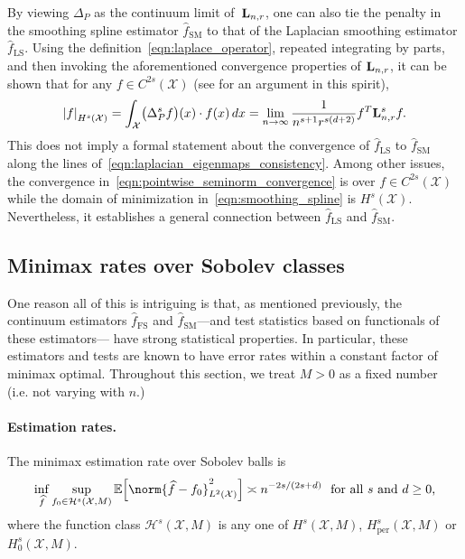\documentclass{article}
\newcommand{\abs}[1]{\left \lvert #1 \right \rvert}
\newcommand{\1}{\mathbf{1}}
\newcommand{\Lap}{{\bf L}}
\newcommand{\Xset}{\mathcal{X}}
\newcommand{\mc}[1]{\mathcal{#1}}
\newcommand{\Ebb}{\mathbb{E}}
\newcommand{\wh}[1]{\widehat{#1}}
\newcommand{\LS}{\mathrm{LS}}
\newcommand{\SM}{\mathrm{SM}}
\newcommand{\OS}{\mathrm{FS}}
\theoremstyle{alden}
\theoremstyle{aldenthm}
\theoremstyle{definition}
\theoremstyle{remark}
\begin{document}
By viewing $\Delta_P$ as the continuum limit of~$\Lap_{n,r}$, one can also tie the penalty in the smoothing spline estimator $\wh{f}_{\SM}$ to that of the Laplacian smoothing estimator $\wh{f}_{\LS}$. Using the definition~\eqref{eqn:laplace_operator}, repeated integrating by parts, and then invoking the aforementioned convergence properties of $\Lap_{n,r}$, it can be shown that for any $f \in C^{2s}(\Xset)$ (see \citet{zhou11} for an argument in this spirit),
\begin{equation}
\label{eqn:pointwise_seminorm_convergence}
\abs{f}_{H^s(\Xset)} = \int_{\Xset} \bigl(\Delta_P^sf\bigr)(x) \cdot f(x) \,dx = \lim_{n \to \infty} \frac{1}{n^{s + 1}r^{s(d + 2)}}f^T \Lap_{n,r}^s f.
\end{equation}
This does not imply a formal statement about the convergence of $\wh{f}_{\LS}$ to $\wh{f}_{\SM}$ along the lines of~\eqref{eqn:laplacian_eigenmaps_consistency}. Among other issues, the convergence in~\eqref{eqn:pointwise_seminorm_convergence} is over $f \in C^{2s}(\Xset)$ while the domain of minimization in~\eqref{eqn:smoothing_spline} is $H^{s}(\Xset)$. Nevertheless, it establishes a general connection between $\wh{f}_{\LS}$ and $\wh{f}_{\SM}$.

\subsection{Minimax rates over Sobolev classes}
\label{subsec:minimax_rates}
One reason all of this is intriguing is that, as mentioned previously, the continuum estimators $\wh{f}_{\OS}$ and $\wh{f}_{\SM}$---and test statistics based on functionals of these estimators--- have strong statistical properties. In particular, these estimators and tests are known to have error rates within a constant factor of minimax optimal. Throughout this section, we treat $M > 0$ as a fixed number (i.e. not varying with $n$.)

\paragraph{Estimation rates.}
The minimax estimation rate over Sobolev balls is 
\begin{equation}
\label{eqn:sobolev_space_estimation_minimax_rate}
\inf_{\wh{f}} \sup_{f_0 \in \mc{H}^s(\Xset, M)} \Ebb\Bigl[\norm{\wh{f} - f_0}_{L^2(\Xset)}^2\Bigr] \asymp n^{-2s/(2s + d)}~~\textrm{for all $s$ and $d \geq 0$,}
\end{equation}
where the function class $\mc{H}^s(\Xset,M)$ is any one of $H^s(\Xset,M)$, $H_{\mathrm{per}}^s(\Xset,M)$ or $H_0^s(\Xset,M)$. 
\end{document}

